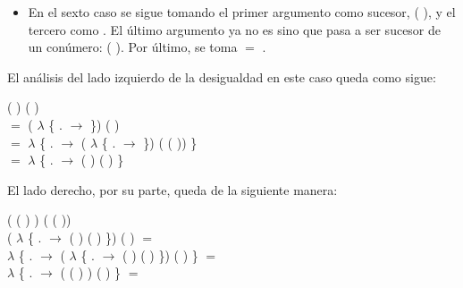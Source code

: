 \begin{AgdaAlign}
\begin{itemize}
\item En el sexto caso se sigue tomando el primer argumento como sucesor, ( ), y el tercero como . El último argumento ya no es  sino que pasa a ser sucesor de un conúmero: ( ). Por último, se toma  $=$ .
\end{itemize}

El análisis del lado izquierdo de la desigualdad en este caso queda como sigue:

 (  \AgdaFunction{+} ) ( \AgdaFunction{+}  ) \\
$=$  ( $\lambda$ \{ . $\rightarrow$   \AgdaFunction{+}  \}) ( ) \\
$=$  $\lambda$ \{ . $\rightarrow$  ( $\lambda$ \{ . $\rightarrow$   \AgdaFunction{+}  \}) ( ( )) \} \\
$=$  $\lambda$ \{ . $\rightarrow$  (  \AgdaFunction{+} ) ( ) \} 

El lado derecho, por su parte, queda de la siguiente manera:

\begin{flushright}
( ( ) ) \AgdaFunction{+} (  ( ))\\ 
( $\lambda$ \{ . $\rightarrow$  ( ) ( ) \}) \AgdaFunction{+} ( ) $=$ \\
 $\lambda$ \{ . $\rightarrow$ ( $\lambda$ \{ . $\rightarrow$  ( ) ( ) \}) \AgdaFunction{+} ( ) \}  $=$  \\
 $\lambda$ \{ . $\rightarrow$ ( ( )  )  \AgdaFunction{+} ( ) \} $=$
\end{flushright} 


\end{AgdaAlign}
